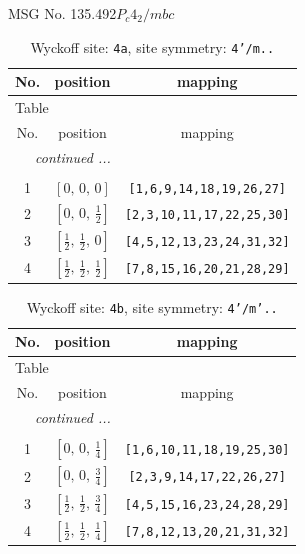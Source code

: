 \documentclass[fleqn,8pt]{jsarticle}
\begin{document}
\setcounter{MaxMatrixCols}{32}

\renewcommand{\tablename}{Table~}
\renewcommand{\figurename}{Figure~}
\begin{center}
\LARGE
MSG No. 135.492\quad$P_{c}4_{2}/mbc$
\end{center}
\renewcommand{\arraystretch}{1.2}
\begin{longtable}{ccc}
\caption{Wyckoff site: {\tt 4a}, site symmetry: {\tt 4'/m..}}
 \\
 \hline \hline
No. & position & mapping \\ \hline \endfirsthead

\multicolumn{2}{l}{\tablename\ \thetable{}} \\
 \hline \hline
No. & position & mapping \\ \hline \endhead

 \hline \hline
\multicolumn{2}{r}{\footnotesize\it continued ...} \\ \endfoot

 \hline \hline
\multicolumn{2}{r}{} \\ \endlastfoot

1 & $\left[ 0,\, 0,\, 0 \right]$ & {\tt [1,6,9,14,18,19,26,27]} \\ \hline
2 & $\left[ 0,\, 0,\, \frac{1}{2} \right]$ & {\tt [2,3,10,11,17,22,25,30]} \\ \hline
3 & $\left[ \frac{1}{2},\, \frac{1}{2},\, 0 \right]$ & {\tt [4,5,12,13,23,24,31,32]} \\ \hline
4 & $\left[ \frac{1}{2},\, \frac{1}{2},\, \frac{1}{2} \right]$ & {\tt [7,8,15,16,20,21,28,29]} \\
\end{longtable}
\renewcommand{\arraystretch}{1.2}
\begin{longtable}{ccc}
\caption{Wyckoff site: {\tt 4b}, site symmetry: {\tt 4'/m'..}}
 \\
 \hline \hline
No. & position & mapping \\ \hline \endfirsthead

\multicolumn{2}{l}{\tablename\ \thetable{}} \\
 \hline \hline
No. & position & mapping \\ \hline \endhead

 \hline \hline
\multicolumn{2}{r}{\footnotesize\it continued ...} \\ \endfoot

 \hline \hline
\multicolumn{2}{r}{} \\ \endlastfoot

1 & $\left[ 0,\, 0,\, \frac{1}{4} \right]$ & {\tt [1,6,10,11,18,19,25,30]} \\ \hline
2 & $\left[ 0,\, 0,\, \frac{3}{4} \right]$ & {\tt [2,3,9,14,17,22,26,27]} \\ \hline
3 & $\left[ \frac{1}{2},\, \frac{1}{2},\, \frac{3}{4} \right]$ & {\tt [4,5,15,16,23,24,28,29]} \\ \hline
4 & $\left[ \frac{1}{2},\, \frac{1}{2},\, \frac{1}{4} \right]$ & {\tt [7,8,12,13,20,21,31,32]} \\
\end{longtable}
\end{document}

